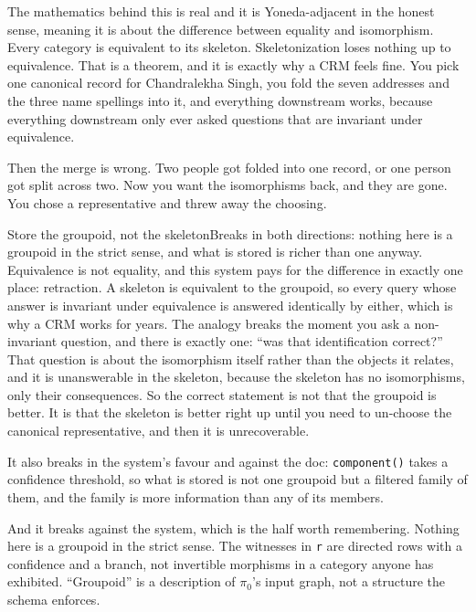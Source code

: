 The mathematics behind this is real and it is Yoneda-adjacent in the honest sense, meaning it is about the difference between equality and isomorphism. Every category is equivalent to its skeleton. Skeletonization loses nothing up to equivalence. That is a theorem, and it is exactly why a CRM feels fine. You pick one canonical record for Chandralekha Singh, you fold the seven addresses and the three name spellings into it, and everything downstream works, because everything downstream only ever asked questions that are invariant under equivalence.

Then the merge is wrong. Two people got folded into one record, or one person got split across two. Now you want the isomorphisms back, and they are gone. You chose a representative and threw away the choosing.

\begin{Analogy}{Store the groupoid, not the skeleton}{Breaks in both directions: nothing here is a groupoid in the strict sense, and what is stored is richer than one anyway.}
Equivalence is not equality, and this system pays for the difference in exactly one place: retraction. A skeleton is equivalent to the groupoid, so every query whose answer is invariant under equivalence is answered identically by either, which is why a CRM works for years. The analogy breaks the moment you ask a non-invariant question, and there is exactly one: ``was that identification correct?'' That question is about the isomorphism itself rather than the objects it relates, and it is unanswerable in the skeleton, because the skeleton has no isomorphisms, only their consequences. So the correct statement is not that the groupoid is better. It is that the skeleton is better right up until you need to un-choose the canonical representative, and then it is unrecoverable.

It also breaks in the system's favour and against the doc: \texttt{component()} takes a confidence threshold, so what is stored is not one groupoid but a filtered family of them, and the family is more information than any of its members.

And it breaks against the system, which is the half worth remembering. Nothing here is a groupoid in the strict sense. The witnesses in \texttt{r} are directed rows with a confidence and a branch, not invertible morphisms in a category anyone has exhibited. ``Groupoid'' is a description of $\pi_0$'s input graph, not a structure the schema enforces.
\end{Analogy}

